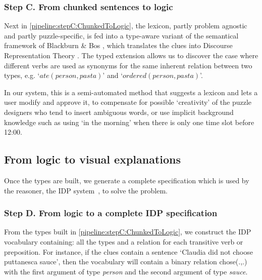 \subsubsection*{Step C. From chunked sentences to logic} Next in \ref{pipeline:stepC:ChunkedToLogic}, the lexicon, partly problem agnostic and partly puzzle-specific, is fed into a type-aware variant of the semantical framework of Blackburn \& Bos \cite{Blackburn2005,Blackburn2006}, which translates the clues into Discourse Representation Theory \cite{DRT}.
The typed extension allows us to discover the case where different verbs are used as synonyms for the same inherent relation between two types, e.g. `$ate(person, pasta)$' and `$ordered(person, pasta)$'.

In our system, this is a semi-automated method that suggests a lexicon and lets a user modify and approve it, to compensate for possible `creativity' of the puzzle designers who tend to insert ambiguous words, or use implicit background knowledge such as using `in the morning' when there is only one time slot before 12:00.

\subsection{From logic to visual explanations}\label{sec:pipeline:IDPtoExplanations}
Once the types are built, we generate a complete specification which is used by the reasoner, the IDP system~\cite{IDP}, to solve the problem. 

\subsubsection*{Step D. From logic to a complete IDP specification}
From the types built in \ref{pipeline:stepC:ChunkedToLogic}, we construct the IDP vocabulary containing: all the types and a relation for each transitive verb or preposition. 
For instance, if the clues contain a sentence `Claudia did not choose puttanesca sauce', then the vocabulary will contain a binary relation chose(.,.) with the first argument of type \textit{person} and the second argument of type \textit{sauce}.

